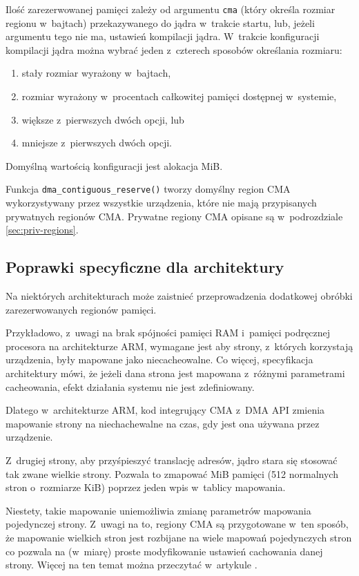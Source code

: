 Ilość zarezerwowanej pamięci zależy od argumentu \lstinline|cma|
(który określa rozmiar regionu w~bajtach) przekazywanego do jądra
w~trakcie startu, lub, jeżeli argumentu tego nie ma, ustawień
kompilacji jądra.  W~trakcie konfiguracji kompilacji jądra można
wybrać jeden z~czterech sposobów określania rozmiaru:

\begin{enumerate}
\item stały rozmiar wyrażony w~bajtach,
\item rozmiar wyrażony w~procentach całkowitej pamięci dostępnej
  w~systemie,
\item większe z~pierwszych dwóch opcji, lub
\item mniejsze z~pierwszych dwóch opcji.
\end{enumerate}

Domyślną wartością konfiguracji jest alokacja \unit[16]{MiB}.

Funkcja \lstinline|dma_contiguous_reserve()| tworzy domyślny region
CMA wykorzystywany przez wszystkie urządzenia, które nie mają
przypisanych prywatnych regionów CMA.  Prywatne regiony CMA opisane są
w~podrozdziale \ref{sec:priv-regions}.


\subsection{Poprawki specyficzne dla architektury}

Na niektórych architekturach może zaistnieć przeprowadzenia dodatkowej
obróbki zarezerwowanych regionów pamięci.

Przykładowo, z~uwagi na brak spójności pamięci RAM i~pamięci
podręcznej procesora na architekturze ARM, wymagane jest aby strony,
z~których korzystają urządzenia, były mapowane jako niecacheowalne.
Co więcej, specyfikacja architektury mówi, że jeżeli dana strona jest
mapowana z~różnymi parametrami cacheowania, efekt działania systemu
nie jest zdefiniowany.

Dlatego w~architekturze ARM, kod integrujący CMA z~DMA API zmienia
mapowanie strony na niechachewalne na czas, gdy jest ona używana przez
urządzenie.

Z~drugiej strony, aby przyśpieszyć translację adresów, jądro stara się
stosować tak zwane wielkie strony.  Pozwala to zmapować \unit[2]{MiB}
pamięci (512 normalnych stron o~rozmiarze \unit[4]{KiB}) poprzez jeden
wpis w~tablicy mapowania.

Niestety, takie mapowanie uniemożliwia zmianę parametrów mapowania
pojedynczej strony.  Z~uwagi na to, regiony CMA są przygotowane w~ten
sposób, że mapowanie wielkich stron jest rozbijane na wiele mapowań
pojedynczych stron co pozwala na (w~miarę) proste modyfikowanie
ustawień cachowania danej strony.  Więcej na ten temat można
przeczytać w~artykule \cite{bib:cma-and-arm}.

